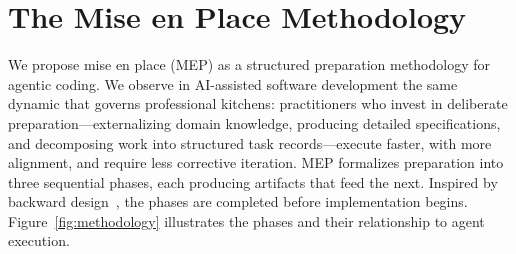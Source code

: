 \section{The Mise en Place Methodology}
\label{sec:methodology}

We propose mise en place (MEP) as a structured preparation
methodology for agentic coding. We observe in AI-assisted software development the same
dynamic that governs professional kitchens: practitioners who invest
in deliberate preparation---externalizing domain knowledge,
producing detailed specifications, and decomposing work into
structured task records---execute faster, with more alignment, and
require less corrective iteration. MEP formalizes preparation into
three sequential phases, each producing artifacts that feed the
next. Inspired by backward design~\cite{wiggins1998understanding},
the phases are completed before implementation begins.
Figure~\ref{fig:methodology} illustrates the phases and their
relationship to agent execution.

